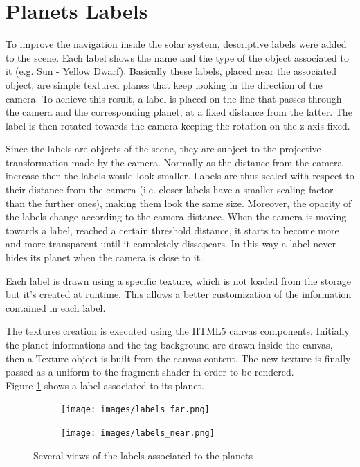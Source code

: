 \documentclass[paper=a4, fontsize=11pt]{scrartcl} %
\numberwithin{equation}{section} %
\numberwithin{figure}{section} %
\numberwithin{table}{section} %
\theoremstyle{definition}
\begin{document}
\section{Planets Labels}

To improve the navigation inside the solar system, descriptive labels
were added to the scene. Each label shows the name and the type of the
object associated to it (e.g. Sun - Yellow Dwarf).
Basically these labels, placed near the associated object, are simple textured planes that keep looking in the direction of the camera. To achieve this result, a label is placed on the line that passes through the camera and the corresponding planet, at a fixed distance from the latter. The label is then rotated towards the camera
keeping the rotation on the z-axis fixed.

Since the labels are objects of the scene, they are subject to the projective
transformation made by the camera. Normally as the distance from the camera increase then the labels would look smaller. Labels are thus scaled with respect to their distance from the camera (i.e. closer labels have a smaller scaling factor than the further ones), making them look the same size.
Moreover, the opacity of the labels change according to the camera distance.
When the camera is moving towards a label, reached a certain threshold distance,
it starts to become more and more
transparent until it completely dissapears.
In this way a label never hides its planet when the camera is close to it.

Each label is drawn using a specific texture, which is not loaded from the
storage but it's created at runtime. This allows a better customization of the
information contained in each label.

The textures creation is executed using the HTML5 canvas components. Initially the planet informations and the tag background are drawn inside the canvas, then a Texture object is built from the canvas content. The new texture is finally passed as a uniform to the fragment shader in order to be rendered.\\
Figure \ref{fig:labels} shows a label associated to its planet.

\begin{figure}
	\centering
	\begin{subfigure}{.4\textwidth}
		\centering
		\texttt{[image: images/labels\_far.png]}
	\end{subfigure}
	\begin{subfigure}{.4\textwidth}
		\centering
		\texttt{[image: images/labels\_near.png]}
	\end{subfigure}
	\caption{Several views of the labels associated to the planets}
	\label{fig:labels}
\end{figure}
\end{document}
